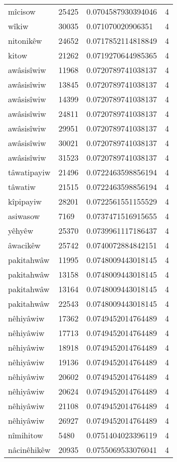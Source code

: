 \begin{longtable}{llll}
mîcisow & 25425 & 0.0704587930394046 & 4 \\
wîkiw & 30035 & 0.071070020906351 & 4 \\
nitonikêw & 24652 & 0.0717852114818849 & 4 \\
kitow & 21262 & 0.0719270644985365 & 4 \\
awâsisîwiw & 11968 & 0.0720789741038137 & 4 \\
awâsisîwiw & 13845 & 0.0720789741038137 & 4 \\
awâsisîwiw & 14399 & 0.0720789741038137 & 4 \\
awâsisîwiw & 24811 & 0.0720789741038137 & 4 \\
awâsisîwiw & 29951 & 0.0720789741038137 & 4 \\
awâsisîwiw & 30021 & 0.0720789741038137 & 4 \\
awâsisîwiw & 31523 & 0.0720789741038137 & 4 \\
tâwatipayiw & 21496 & 0.0722463598856194 & 4 \\
tâwatiw & 21515 & 0.0722463598856194 & 4 \\
kîpipayiw & 28201 & 0.0722561551155529 & 4 \\
asiwasow & 7169 & 0.0737471516915655 & 4 \\
yêhyêw & 25370 & 0.0739961117186437 & 4 \\
âwacikêw & 25742 & 0.0740072884842151 & 4 \\
pakitahwâw & 11995 & 0.0748009443018145 & 4 \\
pakitahwâw & 13158 & 0.0748009443018145 & 4 \\
pakitahwâw & 13164 & 0.0748009443018145 & 4 \\
pakitahwâw & 22543 & 0.0748009443018145 & 4 \\
nêhiyâwiw & 17362 & 0.0749452014764489 & 4 \\
nêhiyâwiw & 17713 & 0.0749452014764489 & 4 \\
nêhiyâwiw & 18918 & 0.0749452014764489 & 4 \\
nêhiyâwiw & 19136 & 0.0749452014764489 & 4 \\
nêhiyâwiw & 20602 & 0.0749452014764489 & 4 \\
nêhiyâwiw & 20624 & 0.0749452014764489 & 4 \\
nêhiyâwiw & 21108 & 0.0749452014764489 & 4 \\
nêhiyâwiw & 26927 & 0.0749452014764489 & 4 \\
nîmihitow & 5480 & 0.0751404023396119 & 4 \\
nâcinêhikêw & 20935 & 0.0755069533076041 & 4 \\

\end{longtable}
